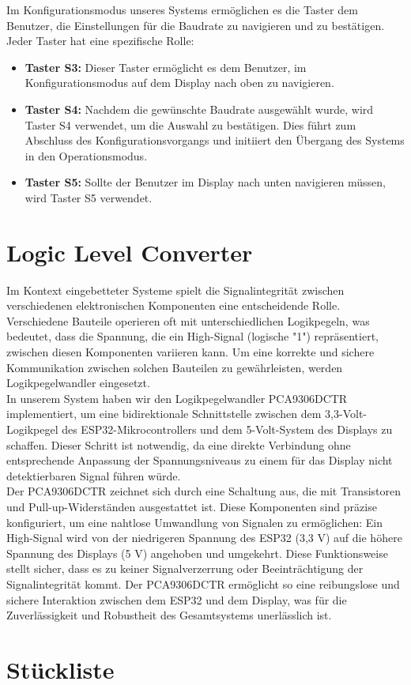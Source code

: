 \noindent Im Konfigurationsmodus unseres Systems ermöglichen es die Taster dem Benutzer, die Einstellungen für die Baudrate zu navigieren und zu bestätigen. Jeder Taster hat eine spezifische Rolle:

\begin{itemize}
  \item \textbf{Taster S3:} Dieser Taster ermöglicht es dem Benutzer, im Konfigurationsmodus auf dem Display nach oben zu navigieren.
  
  \item \textbf{Taster S4:} Nachdem die gewünschte Baudrate ausgewählt wurde, wird Taster S4 verwendet, um die Auswahl zu bestätigen. Dies führt zum Abschluss des Konfigurationsvorgangs und initiiert den Übergang des Systems in den Operationsmodus.
  
  \item \textbf{Taster S5:} Sollte der Benutzer im Display nach unten navigieren müssen, wird Taster S5 verwendet.
\end{itemize}


\section{Logic Level Converter}
\noindent Im Kontext eingebetteter Systeme spielt die Signalintegrität zwischen verschiedenen elektronischen Komponenten eine entscheidende Rolle. Verschiedene Bauteile operieren oft mit unterschiedlichen Logikpegeln, was bedeutet, dass die Spannung, die ein High-Signal (logische "1") repräsentiert, zwischen diesen Komponenten variieren kann. Um eine korrekte und sichere Kommunikation zwischen solchen Bauteilen zu gewährleisten, werden Logikpegelwandler eingesetzt.\\

\noindent In unserem System haben wir den Logikpegelwandler PCA9306DCTR implementiert, um eine bidirektionale Schnittstelle zwischen dem 3,3-Volt-Logikpegel des ESP32-Mikrocontrollers und dem 5-Volt-System des Displays zu schaffen. Dieser Schritt ist notwendig, da eine direkte Verbindung ohne entsprechende Anpassung der Spannungsniveaus zu einem für das Display nicht detektierbaren Signal führen würde.\\

\noindent Der PCA9306DCTR zeichnet sich durch eine Schaltung aus, die mit Transistoren und Pull-up-Widerständen ausgestattet ist. Diese Komponenten sind präzise konfiguriert, um eine nahtlose Umwandlung von Signalen zu ermöglichen: Ein High-Signal wird von der niedrigeren Spannung des ESP32 (3,3 V) auf die höhere Spannung des Displays (5 V) angehoben und umgekehrt. Diese Funktionsweise stellt sicher, dass es zu keiner Signalverzerrung oder Beeinträchtigung der Signalintegrität kommt. Der PCA9306DCTR ermöglicht so eine reibungslose und sichere Interaktion zwischen dem ESP32 und dem Display, was für die Zuverlässigkeit und Robustheit des Gesamtsystems unerlässlich ist.\\

\section{Stückliste}